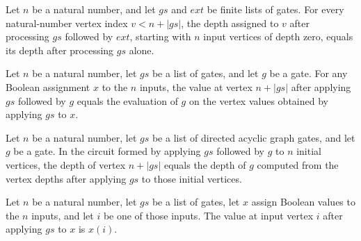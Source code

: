 \begin{theorem}
\label{BoolCircuit.vertexDepth_append}
\leanok
{}
Let $n$ be a natural number, and let $gs$ and $ext$ be finite lists of gates. For every
natural-number vertex index $v<n+|gs|$, the depth assigned to $v$ after processing $gs$
followed by $ext$, starting with $n$ input vertices of depth zero, equals its depth
after processing $gs$ alone.
\end{theorem}

\begin{theorem}
\label{BoolCircuit.vertexValue_last}
\leanok
{}
Let $n$ be a natural number, let $gs$ be a list of gates, and let $g$ be a gate. For any
Boolean assignment $x$ to the $n$ inputs, the value at vertex $n+|gs|$ after applying
$gs$ followed by $g$ equals the evaluation of $g$ on the vertex values obtained by
applying $gs$ to $x$.
\end{theorem}

\begin{theorem}
\label{BoolCircuit.vertexDepth_last}
\leanok
{}
Let $n$ be a natural number, let $gs$ be a list of directed acyclic graph gates, and let
$g$ be a gate. In the circuit formed by applying $gs$ followed by $g$ to $n$ initial
vertices, the depth of vertex $n+|gs|$ equals the depth of $g$ computed from the vertex
depths after applying $gs$ to those initial vertices.
\end{theorem}

\begin{theorem}
\label{BoolCircuit.vertexValue_input}
\leanok
{}
Let $n$ be a natural number, let $gs$ be a list of gates, let $x$ assign Boolean values
to the $n$ inputs, and let $i$ be one of those inputs. The value at input vertex $i$
after applying $gs$ to $x$ is $x(i)$.
\end{theorem}

